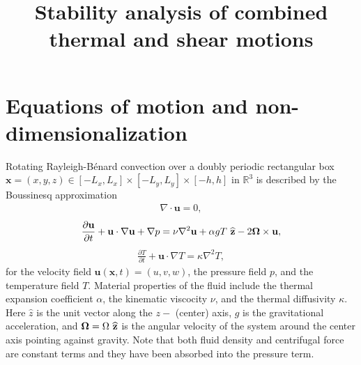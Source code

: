 \documentclass[12pt, a4paper]{article}
\title{Stability analysis of combined thermal and shear motions}
\author{}
\begin{document}
\maketitle


\section{Equations of motion and non-dimensionalization}
Rotating Rayleigh-B{\'e}nard convection over a doubly periodic rectangular box $\textbf{x}=(x,y,z)\in [-L_x, L_x]\times[-L_y, L_y]\times[-h, h]$ in $\mathbb{R}^3$ is described by the Boussinesq approximation \cite{Chan61}
\begin{align}\label{continuity}
\nabla\cdot\textbf{u}=0,
\end{align}
\begin{align}\label{momentum}
\frac{\partial\textbf{u}}{\partial t}+\textbf{u}\cdot\nabla\textbf{u}+\nabla p= \nu\nabla^2\textbf{u}+\alpha g T ~\widehat{\bf{z}}-2\bf{\Omega}\times\textbf{u},
\end{align}
\begin{align}\label{thermal}
\frac{\partial T}{\partial t}+ \textbf{u}\cdot\nabla T=\kappa\nabla^2 T,
\end{align}
for the velocity field $\textbf{u}(\textbf{x},t)=(u, v, w)$, the pressure field $p$, and the temperature field $T$. Material properties of the fluid include the thermal expansion coefficient $\alpha$, the kinematic  viscocity $\nu$, and the thermal diffusivity $\kappa$. Here $\widehat{z}$ is the unit vector along the $z-$ (center) axis, $g$ is the gravitational acceleration, and ${\bm{\Omega}} = \Omega ~\widehat{\bf{z}}$ is the angular velocity of the system around the center axis pointing against gravity. Note that both fluid density and centrifugal force are constant terms and they have been absorbed into the pressure term. 
\end{document}

